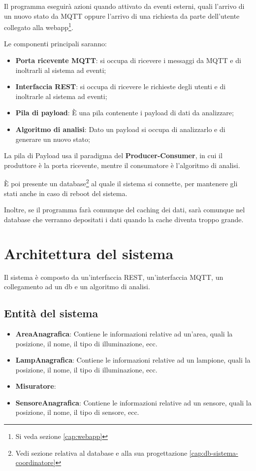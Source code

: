 Il programma eseguirà azioni quando attivato da eventi esterni, quali l'arrivo di un nuovo stato da MQTT oppure l'arrivo di una richiesta da parte dell'utente collegato alla webapp\footnote{Si veda sezione \ref{cap:webapp}}.

Le componenti principali saranno:

\begin{itemize}
    \item \textbf{Porta ricevente MQTT}: si occupa di ricevere i messaggi da MQTT e di inoltrarli al sistema ad eventi;
    \item \textbf{Interfaccia REST}: si occupa di ricevere le richieste degli utenti e di inoltrarle al sistema ad eventi;
    \item \textbf{Pila di payload}: È una pila contenente i payload di dati da analizzare;
    \item \textbf{Algoritmo di analisi}: Dato un payload si occupa di analizzarlo e di generare un nuovo stato;
\end{itemize}

La pila di Payload usa il paradigma del \textbf{Producer-Consumer}, in cui il produttore è la porta ricevente, mentre il consumatore è l'algoritmo di analisi.

È poi presente un database\footnote{Vedi sezione relativa al database e alla sua progettazione \ref{cap:db-sistema-coordinatore}} al quale il sistema si connette, per mantenere gli stati anche in caso di reboot del sistema.

Inoltre, se il programma farà comunque del caching dei dati, sarà comunque nel database che verranno depositati i dati quando la cache diventa troppo grande.

\section{Architettura del sistema}

Il sistema è composto da un'interfaccia REST, un'interfaccia MQTT, un collegamento ad un db e un algoritmo di analisi.

\subsection{Entità del sistema}

\begin{itemize}
    \item \textbf{AreaAnagrafica}: Contiene le informazioni relative ad un'area, quali la posizione, il nome, il tipo di illuminazione, ecc.
    \item \textbf{LampAnagrafica}: Contiene le informazioni relative ad un lampione, quali la posizione, il nome, il tipo di illuminazione, ecc.
    \item \textbf{Misuratore}:
    \item \textbf{SensoreAnagrafica}: Contiene le informazioni relative ad un sensore, quali la posizione, il nome, il tipo di sensore, ecc.
\end{itemize}

